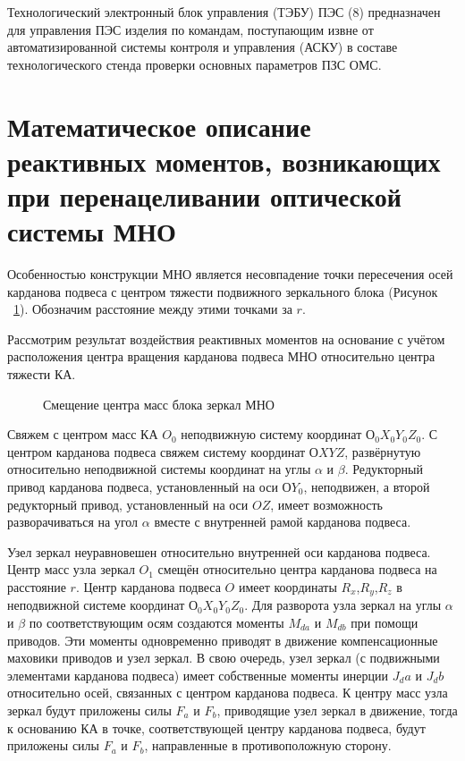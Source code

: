 Технологический электронный блок управления (ТЭБУ) ПЭС (8) предназначен для управления ПЭС изделия по командам, поступающим извне от автоматизированной системы контроля и управления (АСКУ) в составе технологического стенда проверки основных параметров ПЗС ОМС.


\section{Математическое описание реактивных моментов, возникающих при перенацеливании оптической системы МНО}\label{sec:ch2/sec2}

Особенностью конструкции МНО является несовпадение точки пересечения осей карданова подвеса с центром тяжести подвижного зеркального блока (Рисунок ~\cref{fig:tikz_YPK}).
Обозначим расстояние между этими точками за $r$. 

Рассмотрим результат воздействия реактивных моментов на основание с учётом расположения центра вращения карданова подвеса МНО относительно центра тяжести КА.
\begin{figure}[ht]
	\legend{}
	\caption[Пример \texttt{tikz} схемы]{Смещение центра масс блока зеркал МНО}\label{fig:tikz_YPK}
\end{figure}

Свяжем с центром масс КА $O_0$  неподвижную систему координат $О_0X_0Y_0Z_0$. С центром карданова подвеса свяжем систему координат $ОXYZ$, развёрнутую относительно неподвижной системы координат на углы $\alpha$ и $\beta$. Редукторный привод карданова подвеса, установленный на оси $ОY_0$, неподвижен, а второй редукторный привод, установленный на оси $OZ$, имеет возможность разворачиваться на угол $\alpha$ вместе с внутренней рамой карданова подвеса. 

Узел зеркал неуравновешен относительно внутренней оси карданова подвеса. Центр масс узла зеркал $O_1$ смещён относительно центра карданова подвеса на расстояние $r$. Центр карданова подвеса $O$ имеет координаты $R_x$,$R_y$,$R_z$ в неподвижной системе координат $О_0X_0Y_0Z_0$. Для разворота узла зеркал на углы $\alpha$ и $\beta$ по соответствующим осям создаются моменты $M_{da}$ и $M_{db}$ при помощи приводов. Эти моменты одновременно приводят в движение компенсационные маховики приводов и узел зеркал. В свою очередь, узел зеркал (с подвижными элементами карданова подвеса) имеет собственные моменты инерции $J_da$ и $J_db$ относительно осей, связанных с центром карданова подвеса. К центру масс узла зеркал будут приложены силы $F_a$ и $F_b$, приводящие узел зеркал в движение, тогда к основанию КА в точке, соответствующей центру карданова подвеса, будут приложены силы $F_a$ и $F_b$, направленные в противоположную сторону.

